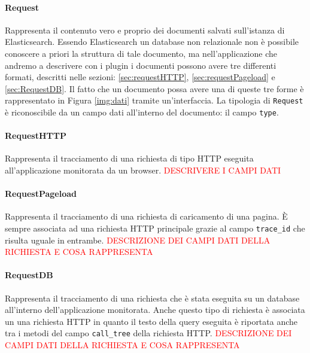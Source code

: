 \paragraph{Request} \Spazio
Rappresenta il contenuto vero e proprio dei documenti salvati sull'istanza di Elasticsearch. Essendo Elasticsearch un database non relazionale non è possibile conoscere a priori la struttura di tale documento, ma nell'applicazione che andremo a descrivere con i plugin i documenti possono avere tre differenti formati, descritti nelle sezioni: \ref{sec:requestHTTP}, \ref{sec:requestPageload} e \ref{sec:RequestDB}. Il fatto che un documento possa avere una di queste tre forme è rappresentato in Figura \ref{img:dati} tramite un'interfaccia. La tipologia di \texttt{Request} è riconoscibile da un campo dati all'interno del documento: il campo \texttt{type}. 
\paragraph{RequestHTTP} \Spazio
\label{sec:requestHTTP}
Rappresenta il tracciamento di una richiesta di tipo HTTP eseguita all'applicazione monitorata da un browser.
\textcolor{red}{DESCRIVERE I CAMPI DATI}

\paragraph{RequestPageload}\Spazio
\label{sec:requestPageload}
Rappresenta il tracciamento di una richiesta di caricamento di una pagina. È sempre associata ad una richiesta HTTP principale grazie al campo \texttt{trace\_id} che risulta uguale in entrambe. 
\textcolor{red}{DESCRIZIONE DEI CAMPI DATI DELLA RICHIESTA E COSA RAPPRESENTA}

\paragraph{RequestDB}\Spazio
\label{sec:RequestDB}
Rappresenta il tracciamento di una richiesta che è stata eseguita su un database all'interno dell'applicazione monitorata. Anche questo tipo di richiesta è associata un una richiesta HTTP in quanto il testo della query eseguita è riportata anche tra i metodi del campo \texttt{call\_tree} della richiesta HTTP.
\textcolor{red}{DESCRIZIONE DEI CAMPI DATI DELLA RICHIESTA E COSA RAPPRESENTA}

